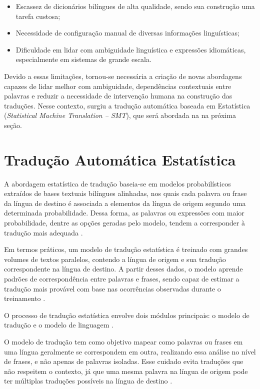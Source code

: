 \begin{itemize}
    \item Escassez de dicionários bilíngues de alta qualidade, sendo sua construção uma tarefa custosa;
    \item Necessidade de configuração manual de diversas informações linguísticas;
    \item Dificuldade em lidar com ambiguidade linguística e expressões idiomáticas, especialmente em sistemas de grande escala.
\end{itemize}

Devido a essas limitações, tornou-se necessária a criação de novas abordagens capazes de lidar melhor com ambiguidade, dependências contextuais entre palavras e reduzir a necessidade de intervenção humana na construção das traduções. Nesse contexto, surgiu a tradução automática baseada em Estatística (\textit{Statistical Machine Translation – SMT}), que será abordada na na próxima seção.


\section{Tradução Automática Estatística}
A abordagem estatística de tradução baseia-se em modelos probabilísticos extraídos de bases textuais bilíngues alinhadas, nos quais cada palavra ou frase da língua de destino é associada a elementos da língua de origem segundo uma determinada probabilidade. Dessa forma, as palavras ou expressões com maior probabilidade, dentre as opções geradas pelo modelo, tendem a corresponder à tradução mais adequada \cite{DBLP:journals/corr/abs-1708-04559}.

Em termos práticos, um modelo de tradução estatística é treinado com grandes volumes de textos paralelos, contendo a língua de origem e sua tradução correspondente na língua de destino. A partir desses dados, o modelo aprende padrões de correspondência entre palavras e frases, sendo capaz de estimar a tradução mais provável com base nas ocorrências observadas durante o treinamento \cite{lokalise_smt_2025}.

O processo de tradução estatística envolve dois módulos principais: o modelo de tradução e o modelo de linguagem \cite{wang2017neural}.

O modelo de tradução tem como objetivo mapear como palavras ou frases em uma língua geralmente se correspondem em outra, realizando essa análise no nível de frases, e não apenas de palavras isoladas. Esse cuidado evita traduções que não respeitem o contexto, já que uma mesma palavra na língua de origem pode ter múltiplas traduções possíveis na língua de destino \cite{wang2017neural}.

